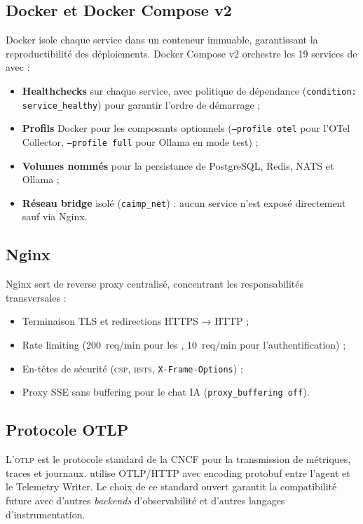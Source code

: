 \subsection{Docker et Docker Compose v2}

Docker \cite{docker_docs} isole chaque service dans un conteneur immuable,
garantissant la reproductibilité des déploiements. Docker Compose v2 orchestre
les 19 services de \caimp{} avec :

\begin{itemize}
  \item \textbf{Healthchecks} sur chaque service, avec politique de dépendance
    (\texttt{condition: service\_healthy}) pour garantir l'ordre de démarrage ;
  \item \textbf{Profils} Docker pour les composants optionnels
    (\texttt{--profile otel} pour l'OTel Collector, \texttt{--profile full}
    pour Ollama en mode test) ;
  \item \textbf{Volumes nommés} pour la persistance de PostgreSQL, Redis, NATS
    et Ollama ;
  \item \textbf{Réseau bridge} isolé (\texttt{caimp\_net}) : aucun service
    n'est exposé directement sauf via Nginx.
\end{itemize}

\subsection{Nginx}

Nginx sert de reverse proxy centralisé, concentrant les responsabilités
transversales :
\begin{itemize}
  \item Terminaison TLS et redirections HTTPS → HTTP ;
  \item Rate limiting (200~req/min pour les \api{}, 10~req/min pour l'authentification) ;
  \item En-têtes de sécurité (\textsc{csp}, \textsc{hsts}, \texttt{X-Frame-Options}) ;
  \item Proxy SSE sans buffering pour le chat IA (\texttt{proxy\_buffering off}).
\end{itemize}

\subsection{Protocole OTLP}

L'\textsc{otlp} \cite{otlp_spec} est le protocole standard de la CNCF pour
la transmission de métriques, traces et journaux. \caimp{} utilise OTLP/HTTP
avec encoding protobuf entre l'agent et le Telemetry Writer. Le choix de ce
standard ouvert garantit la compatibilité future avec d'autres \textit{backends}
d'observabilité et d'autres langages d'instrumentation.

